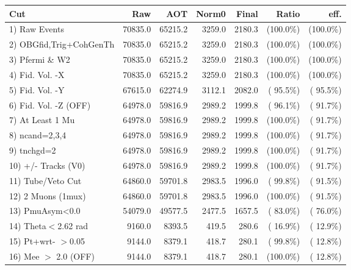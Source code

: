  \begin{table}[h!]\centering
 \begin{tabular}{||l||r|r|r|r|r|r||}
 \hline
 \hline
 Cut & Raw & AOT & Norm0 & Final & Ratio & eff.       \\
 \hline
  1) Raw Events           &      70835.0 &      65215.2 &       3259.0 &       2180.3 & (100.0\%) & (100.0\%) \\
  2) OBGfid,Trig+CohGenTh &      70835.0 &      65215.2 &       3259.0 &       2180.3 & (100.0\%) & (100.0\%) \\
  3) Pfermi \& W2         &      70835.0 &      65215.2 &       3259.0 &       2180.3 & (100.0\%) & (100.0\%) \\
  4) Fid. Vol. -X         &      70835.0 &      65215.2 &       3259.0 &       2180.3 & (100.0\%) & (100.0\%) \\
  5) Fid. Vol. -Y         &      67615.0 &      62274.9 &       3112.1 &       2082.0 & ( 95.5\%) & ( 95.5\%) \\
  6) Fid. Vol. -Z (OFF)   &      64978.0 &      59816.9 &       2989.2 &       1999.8 & ( 96.1\%) & ( 91.7\%) \\
  7) At Least 1 Mu        &      64978.0 &      59816.9 &       2989.2 &       1999.8 & (100.0\%) & ( 91.7\%) \\
  8) ncand=2,3,4          &      64978.0 &      59816.9 &       2989.2 &       1999.8 & (100.0\%) & ( 91.7\%) \\
  9) tnchgd=2             &      64978.0 &      59816.9 &       2989.2 &       1999.8 & (100.0\%) & ( 91.7\%) \\
 10) +/- Tracks (V0)      &      64978.0 &      59816.9 &       2989.2 &       1999.8 & (100.0\%) & ( 91.7\%) \\
 11) Tube/Veto Cut        &      64860.0 &      59701.8 &       2983.5 &       1996.0 & ( 99.8\%) & ( 91.5\%) \\
 12) 2 Muons (1mux)       &      64860.0 &      59701.8 &       2983.5 &       1996.0 & (100.0\%) & ( 91.5\%) \\
 13) PmuAsym<0.0          &      54079.0 &      49577.5 &       2477.5 &       1657.5 & ( 83.0\%) & ( 76.0\%) \\
 14) Theta$<$2.62 rad     &       9160.0 &       8393.5 &        419.5 &        280.6 & ( 16.9\%) & ( 12.9\%) \\
 15) Pt+wrt- $>$0.05      &       9144.0 &       8379.1 &        418.7 &        280.1 & ( 99.8\%) & ( 12.8\%) \\
 16) Mee $>$ 2.0  (OFF)   &       9144.0 &       8379.1 &        418.7 &        280.1 & (100.0\%) & ( 12.8\%) \\

\end{tabular}
\end{table}
